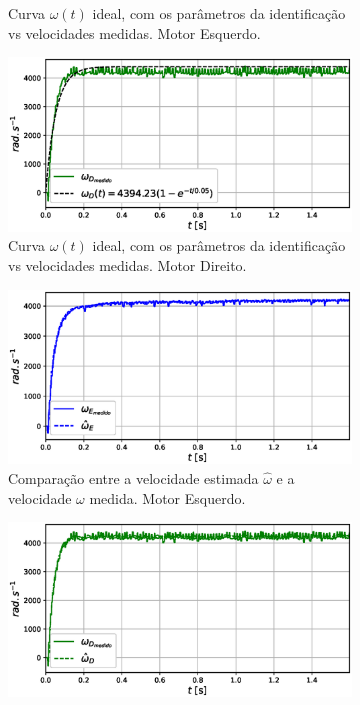 \begin{figure}[H]
\begin{subfigure}{.5\textwidth}
    \caption{Curva $\omega(t)$ ideal, com os parâmetros da identificação vs velocidades medidas. Motor Esquerdo.}
    \label{fig:exp03:regressao_medido_esquerdo}
    \end{subfigure}
    \hfill
    \begin{subfigure}{.5\textwidth}
    \centering
    \includegraphics[width=\textwidth]{figuras/resultados/exp03/regressao_vs_medido_direito100.eps}
    \caption{Curva $\omega(t)$ ideal, com os parâmetros da identificação vs velocidades medidas. Motor Direito.}
    \label{fig:exp03:regressao_medido_direito}
    \end{subfigure}
    \hfill
    \begin{subfigure}{.5\textwidth}
    \centering
    \includegraphics[width=\textwidth]{figuras/resultados/exp03/filtro_vs_sem_filtro_esquerdo100.eps}
    \caption{Comparação entre a velocidade estimada $\hat{\omega}$ e a velocidade $\omega$ medida. Motor Esquerdo.}
    \label{fig:exp03:filtragem_esquerdo}
    \end{subfigure}
    \hfill
    \begin{subfigure}{.5\textwidth}
    \centering
    \includegraphics[width=\textwidth]{figuras/resultados/exp03/filtro_vs_sem_filtro_direito100.eps}

\end{subfigure}
\end{figure}
